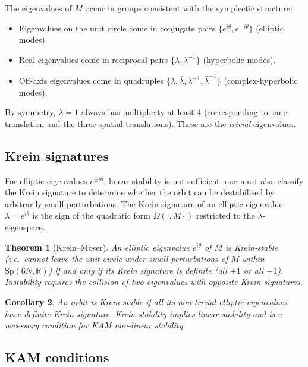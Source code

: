 \documentclass[12pt, a4paper]{article}
\theoremstyle{plain}
\newtheorem{theorem}{Theorem}[section]
\newtheorem{corollary}[theorem]{Corollary}
\theoremstyle{definition}
\newcommand{\R}{\mathbb{R}}
\begin{document}
The eigenvalues of $M$ occur in groups consistent with the symplectic
structure:
\begin{itemize}[leftmargin=1.8em]
  \item Eigenvalues on the unit circle come in conjugate pairs
        $\{e^{i\theta}, e^{-i\theta}\}$ (elliptic modes).
  \item Real eigenvalues come in reciprocal pairs $\{\lambda,
        \lambda^{-1}\}$ (hyperbolic modes).
  \item Off-axis eigenvalues come in quadruples $\{\lambda,
        \bar\lambda, \lambda^{-1}, \bar\lambda^{-1}\}$
        (complex-hyperbolic modes).
\end{itemize}
By symmetry, $\lambda = 1$ always has multiplicity at least 4
(corresponding to time-translation and the three spatial
translations).  These are the \emph{trivial} eigenvalues.

\subsection{Krein signatures}

For elliptic eigenvalues $e^{\pm i\theta}$, linear stability is
not sufficient: one must also classify the Krein signature to
determine whether the orbit can be destabilised by arbitrarily small
perturbations.  The Krein signature of an elliptic eigenvalue
$\lambda = e^{i\theta}$ is the sign of the quadratic form
$\Omega(\cdot, M\cdot)$ restricted to the $\lambda$-eigenspace.

\begin{theorem}[Krein--Moser]\label{thm:km}
An elliptic eigenvalue $e^{i\theta}$ of $M$ is \emph{Krein-stable}
(i.e.\ cannot leave the unit circle under small perturbations of $M$
within $\mathrm{Sp}(6N,\R)$) if and only if its Krein signature is
definite (all $+1$ or all $-1$).  Instability requires the collision
of two eigenvalues with opposite Krein signatures.
\end{theorem}

\begin{corollary}
An orbit is \emph{Krein-stable} if all its non-trivial elliptic
eigenvalues have definite Krein signature.  Krein stability implies
linear stability and is a necessary condition for KAM non-linear
stability.
\end{corollary}

\subsection{KAM conditions}
\end{document}
